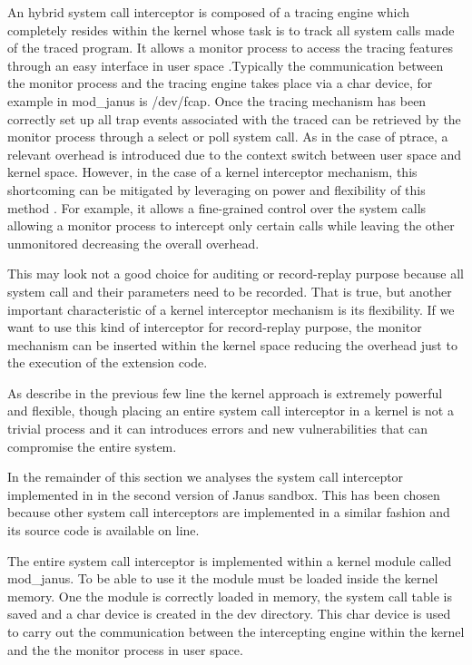 An hybrid system call interceptor is composed of a tracing engine which completely resides within the kernel whose task is to track all system calls made of the traced program. It allows a monitor process to access the tracing features through an easy interface in user space .Typically the communication between the monitor process and the tracing engine takes place via a char device, for example in mod\_janus is /dev/fcap. Once the tracing mechanism has been correctly set up all trap events associated with the traced can be retrieved by the monitor process through a select or poll system call. As in the case of ptrace, a relevant overhead is introduced due to the context switch between user space and kernel space. However, in the case of a kernel interceptor mechanism, this shortcoming can be mitigated by leveraging on power and flexibility of this method . For example, it allows a fine-grained control over the system calls allowing a monitor process to intercept only certain calls while leaving the other unmonitored decreasing the overall overhead.  
 
This may look not a good choice for auditing or record-replay purpose because all system call and their parameters need to be recorded. That is true, but another important characteristic of a kernel interceptor mechanism is its flexibility.  If we want to use this kind of interceptor for record-replay purpose, the monitor mechanism can be inserted within the kernel space reducing the overhead just to the execution of the extension code. 
 
As describe in the previous few line the kernel approach is extremely powerful and flexible, though placing an entire system call interceptor in a kernel is not a trivial process and it can introduces errors and new vulnerabilities that can compromise the entire system. 

In the remainder of this section we analyses the system call interceptor implemented in in the second version of Janus sandbox. This has been chosen because other system call interceptors are implemented in a similar fashion and its source code is available on line. 

The entire system call interceptor is implemented within a kernel module called mod\_janus. To be able to use it the module must be loaded inside the kernel memory. One the module is correctly loaded in memory, the system call table is saved and a char device is created in the dev directory.
This char device is used to carry out the communication between the intercepting engine within the kernel and the the monitor process in user space.

